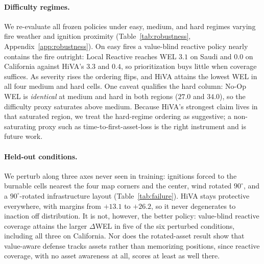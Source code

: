 \documentclass[letterpaper]{article}
\begin{document}
\paragraph{Difficulty regimes.} We re-evaluate all frozen policies under easy, medium, and hard regimes varying fire weather and ignition proximity (Table~\ref{tab:robustness}, Appendix~\ref{app:robustness}). On easy fires a value-blind reactive policy nearly contains the fire outright: Local Reactive reaches WEL $3.1$ on Saudi and $0.0$ on California against HiVA's $3.3$ and $0.4$, so prioritization buys little when coverage suffices. As severity rises the ordering flips, and HiVA attains the lowest WEL in all four medium and hard cells. One caveat qualifies the hard column: No-Op WEL is \emph{identical} at medium and hard in both regions ($27.0$ and $34.0$), so the difficulty proxy saturates above medium. Because HiVA's strongest claim lives in that saturated region, we treat the hard-regime ordering as suggestive; a non-saturating proxy such as time-to-first-asset-loss is the right instrument and is future work.

\paragraph{Held-out conditions.} We perturb along three axes never seen in training: ignitions forced to the burnable cells nearest the four map corners and the center, wind rotated $90^\circ$, and a $90^\circ$-rotated infrastructure layout (Table~\ref{tab:failure}). HiVA stays protective everywhere, with margins from $+13.1$ to $+26.2$, so it never degenerates to inaction off distribution. It is not, however, the better policy: value-blind reactive coverage attains the larger $\Delta$WEL in five of the six perturbed conditions, including all three on California. Nor does the rotated-asset result show that value-aware defense tracks assets rather than memorizing positions, since reactive coverage, with no asset awareness at all, scores at least as well there.
\end{document}
